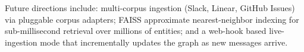 \documentclass[12pt,a4paper]{article}
\begin{document}
Future directions include: multi-corpus ingestion (Slack, Linear, GitHub Issues) via pluggable corpus adapters; FAISS approximate nearest-neighbor indexing for sub-millisecond retrieval over millions of entities; and a web-hook based live-ingestion mode that incrementally updates the graph as new messages arrive.
\end{document}

